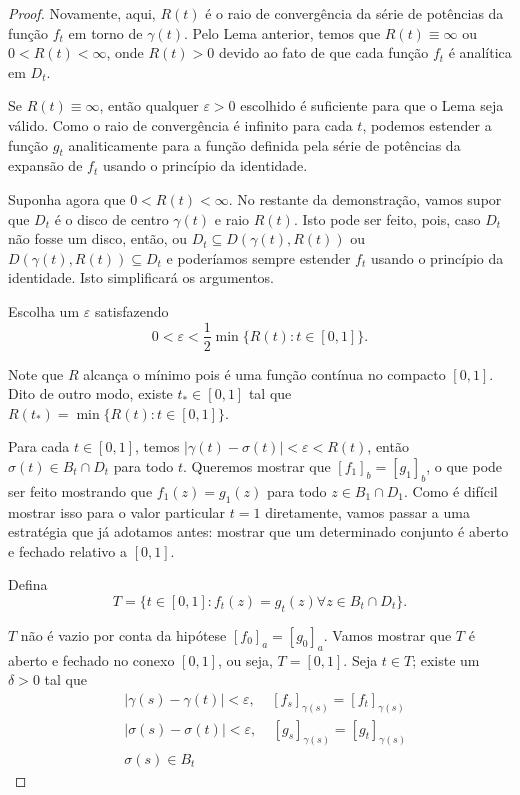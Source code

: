 \begin{proof}
Novamente, aqui, $R(t)$ é o raio de convergência da série de potências da função 
$f_t$ em torno de $\gamma(t)$. Pelo Lema anterior, temos que $R(t) \equiv \infty$ 
ou $0 < R(t) < \infty$, onde $R(t) > 0$ devido ao fato de que cada função $f_t$ é
analítica em $D_t$. 

Se $R(t) \equiv \infty$, então qualquer $\varepsilon > 0$ escolhido é suficiente 
para que o Lema seja válido. Como o raio de convergência é infinito para cada $t$,
podemos estender a função $g_t$ analiticamente para a função definida pela série de
potências da expansão de $f_t$ usando o princípio da identidade.

Suponha agora que $0 < R(t) < \infty$. No restante da demonstração, vamos supor que 
$D_t$ é o disco de centro $\gamma(t)$ e raio $R(t)$. Isto pode ser feito, pois, caso
$D_t$ não fosse um disco, então, ou $D_t \subseteq D(\gamma(t),R(t))$ ou
$D(\gamma(t),R(t)) \subseteq D_t$ e poderíamos sempre estender $f_t$ usando o 
princípio da identidade. Isto simplificará os argumentos.

Escolha um $\varepsilon$ satisfazendo
\begin{equation*}
0 < \varepsilon < \frac{1}{2}\min\{R(t): t \in [0,1]\}.
\end{equation*}

Note que $R$ alcança o mínimo pois é uma função contínua no compacto $[0,1]$. 
Dito de outro modo, existe $t_* \in [0,1]$ tal que $R(t_*) = \min\{R(t): t \in [0,1]\}$.

Para cada $t \in [0,1]$, temos $|\gamma(t) - \sigma(t)| < \varepsilon < R(t)$, então
$\sigma(t) \in B_t \cap D_t$ para todo $t$. Queremos mostrar que $[f_1]_b = [g_1]_b$, 
o que pode ser feito mostrando que $f_1(z) = g_1(z)$ para todo $z \in B_1 \cap D_1$. 
Como é difícil mostrar isso para o valor particular $t=1$ diretamente, vamos passar 
a uma estratégia que já adotamos antes: mostrar que um determinado conjunto é aberto
e fechado relativo a $[0,1]$.

Defina
\begin{equation*}
T = \{t \in [0,1]: f_t(z) = g_t(z) \forall z \in B_t \cap D_t\}.
\end{equation*}

$T$ não é vazio por conta da hipótese $[f_0]_a = [g_0]_a$. Vamos mostrar que $T$ é 
aberto e fechado no conexo $[0,1]$, ou seja, $T = [0,1]$. Seja $t \in T$; 
existe um $\delta > 0$ tal que
\begin{align}
\label{Eq5}
    &|\gamma(s) - \gamma(t)| < \varepsilon, \ \ \ \ \ [f_s]_{\gamma(s)} =
    [f_t]_{\gamma(s)} \\
    &|\sigma(s) - \sigma(t)| < \varepsilon, \ \ \ \ \ [g_s]_{\gamma(s)} =
    [g_t]_{\gamma(s)} \\
    &\sigma(s) \in B_t
\end{align}


\end{proof}
